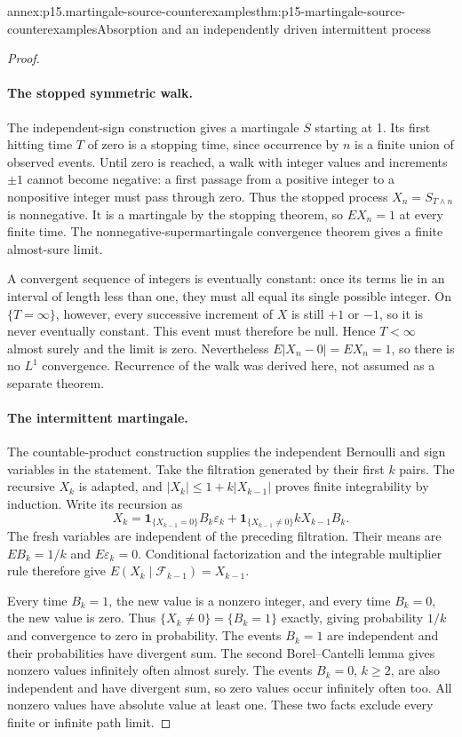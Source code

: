 \begin{annexitem}{annex:p15.martingale-source-counterexamples}{thm:p15-martingale-source-counterexamples}{Absorption and an independently driven intermittent process}
\begin{proof}
\paragraph{The stopped symmetric walk.}
The independent-sign construction gives a martingale \(S\)
starting at 1. Its first hitting time \(T\) of zero is a stopping
time, since occurrence by \(n\) is a finite union of observed events.
Until zero is reached, a walk with integer values and increments
\(\pm1\) cannot become negative: a first passage from a positive
integer to a nonpositive integer must pass through zero.
Thus the stopped process \(X_n=S_{T\wedge n}\) is nonnegative.
It is a martingale by the stopping theorem, so \(EX_n=1\) at
every finite time.
The nonnegative-supermartingale convergence theorem gives a
finite almost-sure limit.

A convergent sequence of integers is eventually constant:
once its terms lie in an interval of length less than one,
they must all equal its single possible integer.
On \(\{T=\infty\}\), however, every successive increment
of \(X\) is still \(+1\) or \(-1\), so it is never eventually
constant. This event must therefore be null.
Hence \(T<\infty\) almost surely and the limit is zero.
Nevertheless \(E|X_n-0|=EX_n=1\), so there is no \(L^1\)
convergence. Recurrence of the walk was derived here, not
assumed as a separate theorem.

\paragraph{The intermittent martingale.}
The countable-product construction supplies the independent
Bernoulli and sign variables in the statement.
Take the filtration generated by their first \(k\) pairs.
The recursive \(X_k\) is adapted, and
\(|X_k|\leq1+k|X_{k-1}|\) proves finite integrability by induction.
Write its recursion as
\[
 X_k=\mathbf1_{\{X_{k-1}=0\}}B_k\varepsilon_k
           +\mathbf1_{\{X_{k-1}\ne0\}}kX_{k-1}B_k.
\]
The fresh variables are independent of the preceding filtration.
Their means are \(EB_k=1/k\) and \(E\varepsilon_k=0\).
Conditional factorization and the integrable multiplier rule
therefore give \(E(X_k\mid\mathcal F_{k-1})=X_{k-1}\).

Every time \(B_k=1\), the new value is a nonzero integer, and
every time \(B_k=0\), the new value is zero.
Thus \(\{X_k\ne0\}=\{B_k=1\}\) exactly, giving probability
\(1/k\) and convergence to zero in probability.
The events \(B_k=1\) are independent and their probabilities
have divergent sum. The second Borel--Cantelli lemma gives
nonzero values infinitely often almost surely.
The events \(B_k=0\), \(k\geq2\), are also independent and
have divergent sum, so zero values occur infinitely often too.
All nonzero values have absolute value at least one.
These two facts exclude every finite or infinite path limit.


\end{proof}
\end{annexitem}
